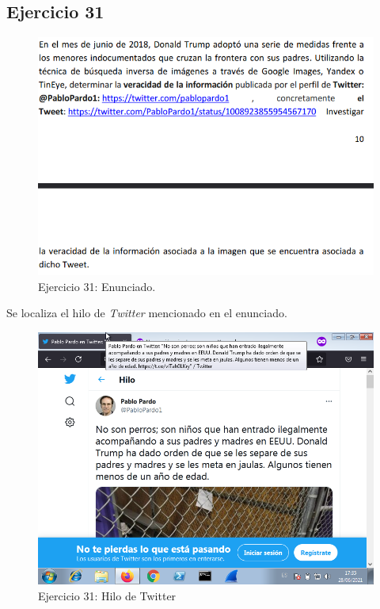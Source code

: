 \documentclass[11pt]{article}
\begin{document}
\subsection{Ejercicio 31}

\begin{figure}[H]
    \caption{Ejercicio 31: Enunciado.}
  \centering
  \includegraphics[scale=0.7]{other/enunciado_p05_e31.png}
\end{figure}

Se localiza el hilo de \textit{Twitter} mencionado en el enunciado.

\begin{figure}[H]
    \caption{Ejercicio 31: Hilo de Twitter}
  \centering
    \includegraphics[scale=0.8]{p05/e31-1.png}
\end{figure}
\end{document}
